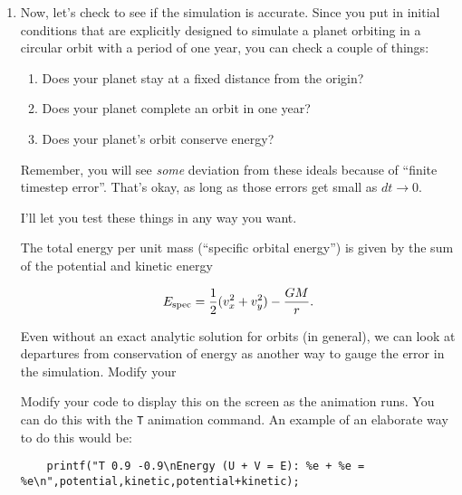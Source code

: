 \documentclass[12pt]{article}
\begin{document}
\begin{enumerate}
%


      \item{Now, let's check to see if the simulation is accurate. Since you put in initial conditions that are explicitly designed to simulate a planet orbiting in a circular
	orbit with a period of one year, you can check a couple of things:

	  \begin{enumerate}
	\item Does your planet stay at a fixed distance from the origin?
	  \item Does your planet complete an orbit in one year?
	  \item Does your planet's orbit conserve energy?
	  \end{enumerate}

	Remember, you will see {\it some} deviation from these ideals because of ``finite timestep error''. That's okay, as long as those errors get small as $dt \rightarrow 0$.

	  I'll let you test these things in any way you want.

	  The total energy per unit mass (``specific orbital energy'') is given by the sum of the potential and kinetic energy

	  \begin{equation}
	E_{\rm spec}=\frac{1}{2}(v_x^2+v_y^2) - \frac{GM}{r}.
	  \end{equation}

	Even without an exact analytic solution for orbits (in general), we can look at departures from conservation of 
	  energy as another way to gauge the error in the simulation. Modify your 

	  Modify your code to display this on the screen as the animation runs. You can do this with the {\tt T} animation command. An example of an elaborate way to do this 
	  would be:

	  \begin{verbatim}
	printf("T 0.9 -0.9\nEnergy (U + V = E): %e + %e = %e\n",potential,kinetic,potential+kinetic);
	\end{verbatim}

}
\end{enumerate}
\end{document}
